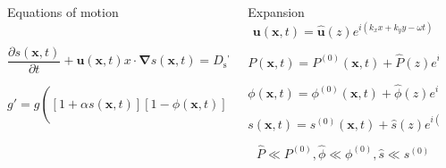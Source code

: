 \documentclass[final]{beamer} %
\begin{document}
\begin{frame}[t]
\begin{columns}[t]
\begin{column}{0.6\paperwidth}
\begin{columns}[t]
\begin{column}{0.43\paperwidth}
\begin{block}{Equations of motion}
\begin{columns}[t]
\begin{column}{0.3\paperwidth}
                    $$ \frac{\partial s(\mathbf{x}, t)}{\partial t} +
                    \mathbf{u}(\mathbf{x}, t)x \cdot \mathbf{\nabla} s(\mathbf{x}, t) =
                    D_{\text{s}} \nabla^{2} s(\mathbf{x}, t) $$

                    $$ g' = g \left( [1 + \alpha s(\mathbf{x}, t)] [1 - \phi(\mathbf{x}, t)]
                    + \frac{\rho_{p} \phi(\mathbf{x}, t)}{\rho_{0}} \right) $$

              \end{column}

            \end{columns}
          \end{block}
        \end{column}
        \begin{column}{0.17\paperwidth}
          \begin{block}{Expansion}
            $$ \mathbf{u}(\mathbf{x}, t) = \mathbf{\hat{u}}(z) e^{i(k_{x} x + k_{y} y - \omega t)}$$

            $$ P(\mathbf{x}, t) = P^{(0)}(\mathbf{x}, t) +
            \hat{P}(z) e^{i(k_{x} x + k_{y} y - \omega t)}$$

            $$ \phi(\mathbf{x}, t) = \phi^{(0)}(\mathbf{x}, t) +
            \hat{\phi}(z) e^{i(k_{x} x + k_{y} y - \omega t)}$$
      
            $$ s(\mathbf{x}, t) = s^{(0)}(\mathbf{x}, t) +
            \hat{s}(z) e^{i(k_{x} x + k_{y} y - \omega t)}$$

            $$\hat{P} \ll P^{(0)}, \hat{\phi} \ll \phi^{(0)}, \hat{s} \ll s^{(0)}$$
          \end{block}

        \end{column}
      \end{columns}
      
    \end{column}

    \begin{column}{0.3\paperwidth}

      \vspace{-3cm}
      
      \begin{columns}[t]
        \begin{column}{0.12\paperwidth}

          \vspace{-2.2cm}


\end{column}
\end{columns}
\end{column}
\end{columns}
\end{frame}
\end{document}
